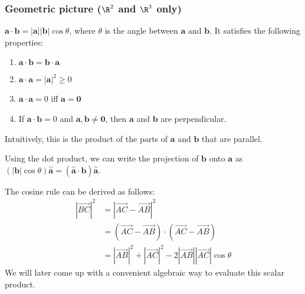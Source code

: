 \documentclass[a4paper]{article}
\begin{document}
\subsubsection{Geometric picture (\texorpdfstring{$\R^2$}{R2} and \texorpdfstring{$\R^3$}{R3} only)}
\begin{defi}
  $\mathbf{a}\cdot\mathbf{b} = \mathbf{|a||b|}\cos\theta$, where $\theta$ is the angle between $\mathbf{a}$ and $\mathbf{b}$. It satisfies the following properties:
  \begin{enumerate}
    \item $\mathbf{a\cdot b = b\cdot a}$
    \item $\mathbf{a\cdot a = |a|}^2 \geq 0$
    \item $\mathbf{a\cdot a} = 0$ iff $\mathbf{a = 0}$
    \item If $\mathbf{a\cdot b} = 0$ and $\mathbf{a, b}\not= \mathbf{0}$, then $\mathbf{a}$ and $\mathbf{b}$ are perpendicular.
  \end{enumerate}
\end{defi}
Intuitively, this is the product of the parts of $\mathbf{a}$ and $\mathbf{b}$ that are parallel.
\begin{center}
\end{center}
Using the dot product, we can write the projection of $\mathbf{b}$ onto $\mathbf{a}$ as $(|\mathbf{b}|\cos\theta)\hat{\mathbf{a}} = \mathbf{(\hat{a}\cdot b)\hat{a}}$.

The cosine rule can be derived as follows:
\begin{align*}
  |\overrightarrow{BC}|^2 &= |\overrightarrow{AC} - \overrightarrow{AB}|^2\\
  &= (\overrightarrow{AC} - \overrightarrow{AB})\cdot (\overrightarrow{AC} - \overrightarrow{AB})\\
  &= |\overrightarrow{AB}|^2 + |\overrightarrow{AC}|^2 - 2|\overrightarrow{AB}||\overrightarrow{AC}|\cos\theta
\end{align*}
We will later come up with a convenient algebraic way to evaluate this scalar product.
\end{document}
